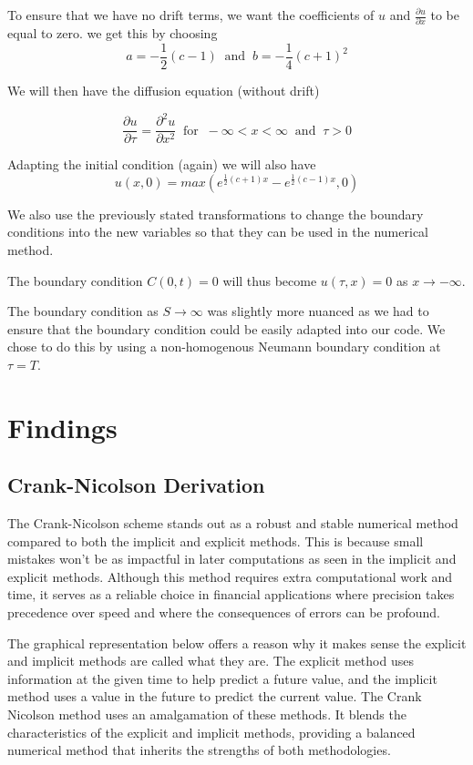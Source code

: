 \documentclass[11pt]{article}
\begin{document}
To ensure that we have no drift terms, we want the coefficients of $u$ and $\frac{\partial u}{\partial x}$ to be equal to zero. we get this by choosing
\[
a = -\frac{1}{2}(c-1)  \;\; \text{and}  \;\; b = -\frac{1} {4}(c+1)^2
\]

We will then have the diffusion equation (without drift)

\[
\frac{\partial u}{\partial \tau} = \frac{\partial^2 u}{\partial x^2} \;\; \text{for} \;\; -\infty < x < \infty \;\; \text{and} \;\; \tau >0
\]

Adapting the initial condition (again) we will also have 
\[
u(x,0) = max(e^{\frac{1}{2}(c+1)x}- e^{\frac{1}{2}(c-1)x} , 0 )
\]

We also use the previously stated transformations to change the boundary conditions into the new variables so that they can be used in the numerical method.

The boundary condition $C(0,t)=0$ will thus become $u(\tau , x) = 0 $ as $x \rightarrow -\infty$. 

The boundary condition as $S \rightarrow \infty$ was slightly more nuanced as we had to ensure that the boundary condition could be easily adapted into our code. We chose to do this by using a non-homogenous Neumann boundary condition at $\tau = T$.

\newpage

\section{Findings}

\subsection{Crank-Nicolson Derivation}

The Crank-Nicolson scheme stands out as a robust and stable numerical method compared to both the implicit and explicit methods. This is because small mistakes won't be as impactful in later computations as seen in the implicit and explicit methods. Although this method requires extra computational work and time, it serves as a reliable choice in financial applications where precision takes precedence over speed and where the consequences of errors can be profound.

The graphical representation below offers a reason why it makes sense the explicit and implicit methods are called what they are. The explicit method uses information at the given time to help predict a future value, and the implicit method uses a value in the future to predict the current value. The Crank Nicolson method uses an amalgamation of these methods. It blends the characteristics of the explicit and implicit methods, providing a balanced numerical method that inherits the strengths of both methodologies.
\end{document}
